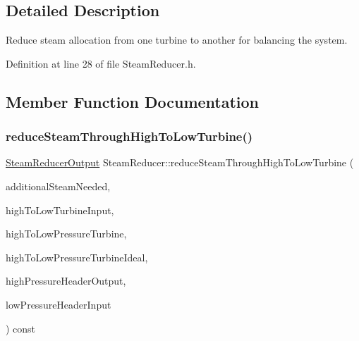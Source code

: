 \begin{DoxyCompactItemize}
\end{DoxyCompactItemize}


\subsection{Detailed Description}
Reduce steam allocation from one turbine to another for balancing the system. 

Definition at line 28 of file Steam\+Reducer.\+h.



\subsection{Member Function Documentation}
\mbox{\label{class_steam_reducer_a87ac83f6821db20e9908ee03b18c81b4}} 
\subsubsection{\texorpdfstring{reduce\+Steam\+Through\+High\+To\+Low\+Turbine()}{reduceSteamThroughHighToLowTurbine()}\hspace{0.1cm}{\footnotesize\ttfamily [1/3]}}
{\footnotesize\ttfamily \hyperlink{class_steam_reducer_output}{Steam\+Reducer\+Output} Steam\+Reducer\+::reduce\+Steam\+Through\+High\+To\+Low\+Turbine (\begin{DoxyParamCaption}\item[{const double}]{additional\+Steam\+Needed,  }\item[{const \hyperlink{class_pressure_turbine}{Pressure\+Turbine} \&}]{high\+To\+Low\+Turbine\+Input,  }\item[{const std\+::shared\+\_\+ptr$<$ \hyperlink{class_turbine}{Turbine} $>$ \&}]{high\+To\+Low\+Pressure\+Turbine,  }\item[{const std\+::shared\+\_\+ptr$<$ \hyperlink{class_turbine}{Turbine} $>$ \&}]{high\+To\+Low\+Pressure\+Turbine\+Ideal,  }\item[{const \hyperlink{struct_steam_system_modeler_tool_1_1_fluid_properties}{Steam\+System\+Modeler\+Tool\+::\+Fluid\+Properties} \&}]{high\+Pressure\+Header\+Output,  }\item[{const std\+::shared\+\_\+ptr$<$ \hyperlink{class_header_not_highest_pressure}{Header\+Not\+Highest\+Pressure} $>$ \&}]{low\+Pressure\+Header\+Input }\end{DoxyParamCaption}) const}

